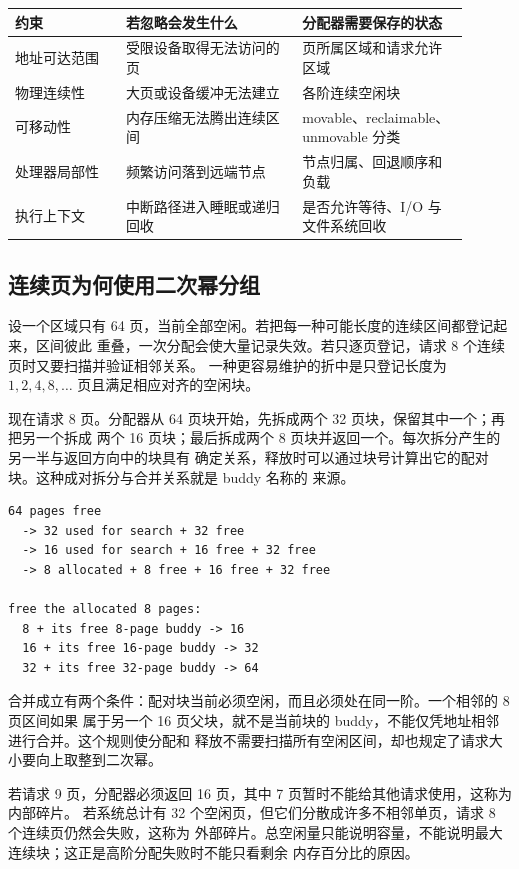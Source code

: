 \begin{longtable}{|F{0.22\linewidth}|F{0.35\linewidth}|F{0.33\linewidth}|}
\toprule
{}
约束 & 若忽略会发生什么 & 分配器需要保存的状态 \\
\midrule
地址可达范围 & 受限设备取得无法访问的页 & 页所属区域和请求允许区域 \\\tablerowrule
物理连续性 & 大页或设备缓冲无法建立 & 各阶连续空闲块 \\\tablerowrule
可移动性 & 内存压缩无法腾出连续区间 & movable、reclaimable、unmovable 分类 \\\tablerowrule
处理器局部性 & 频繁访问落到远端节点 & 节点归属、回退顺序和负载 \\\tablerowrule
执行上下文 & 中断路径进入睡眠或递归回收 & 是否允许等待、I/O 与文件系统回收 \\
\bottomrule
\end{longtable}

\subsection{连续页为何使用二次幂分组}

设一个区域只有 64 页，当前全部空闲。若把每一种可能长度的连续区间都登记起来，区间彼此
重叠，一次分配会使大量记录失效。若只逐页登记，请求 8 个连续页时又要扫描并验证相邻关系。
一种更容易维护的折中是只登记长度为 $1,2,4,8,\ldots$ 页且满足相应对齐的空闲块。

现在请求 8 页。分配器从 64 页块开始，先拆成两个 32 页块，保留其中一个；再把另一个拆成
两个 16 页块；最后拆成两个 8 页块并返回一个。每次拆分产生的另一半与返回方向中的块具有
确定关系，释放时可以通过块号计算出它的配对块。这种成对拆分与合并关系就是 buddy 名称的
来源。

\begin{lstlisting}
64 pages free
  -> 32 used for search + 32 free
  -> 16 used for search + 16 free + 32 free
  -> 8 allocated + 8 free + 16 free + 32 free

free the allocated 8 pages:
  8 + its free 8-page buddy -> 16
  16 + its free 16-page buddy -> 32
  32 + its free 32-page buddy -> 64
\end{lstlisting}

合并成立有两个条件：配对块当前必须空闲，而且必须处在同一阶。一个相邻的 8 页区间如果
属于另一个 16 页父块，就不是当前块的 buddy，不能仅凭地址相邻进行合并。这个规则使分配和
释放不需要扫描所有空闲区间，却也规定了请求大小要向上取整到二次幂。

若请求 9 页，分配器必须返回 16 页，其中 7 页暂时不能给其他请求使用，这称为内部碎片。
若系统总计有 32 个空闲页，但它们分散成许多不相邻单页，请求 8 个连续页仍然会失败，这称为
外部碎片。总空闲量只能说明容量，不能说明最大连续块；这正是高阶分配失败时不能只看剩余
内存百分比的原因。

